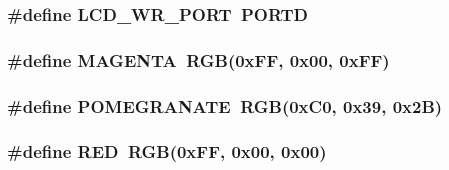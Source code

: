 \subsubsection[{L\+C\+D\+\_\+\+W\+R\+\_\+\+P\+O\+R\+T}]{\setlength{\rightskip}{0pt plus 5cm}\#define L\+C\+D\+\_\+\+W\+R\+\_\+\+P\+O\+R\+T~P\+O\+R\+T\+D}\label{group___s_s_d1289_ga815c38dc74dd91415221223106b0c75b}
\hypertarget{group___s_s_d1289_ga6f699060902f800f12aaae150f3a708e}{}
\subsubsection[{M\+A\+G\+E\+N\+T\+A}]{\setlength{\rightskip}{0pt plus 5cm}\#define M\+A\+G\+E\+N\+T\+A~{\bf R\+G\+B}(0x\+F\+F, 0x00, 0x\+F\+F)}\label{group___s_s_d1289_ga6f699060902f800f12aaae150f3a708e}
\hypertarget{group___s_s_d1289_ga9351998a06712daf19dda267d367074f}{}
\subsubsection[{P\+O\+M\+E\+G\+R\+A\+N\+A\+T\+E}]{\setlength{\rightskip}{0pt plus 5cm}\#define P\+O\+M\+E\+G\+R\+A\+N\+A\+T\+E~{\bf R\+G\+B}(0x\+C0, 0x39, 0x2\+B)}\label{group___s_s_d1289_ga9351998a06712daf19dda267d367074f}
\hypertarget{group___s_s_d1289_ga8d23feea868a983c8c2b661e1e16972f}{}
\subsubsection[{R\+E\+D}]{\setlength{\rightskip}{0pt plus 5cm}\#define R\+E\+D~{\bf R\+G\+B}(0x\+F\+F, 0x00, 0x00)}\label{group___s_s_d1289_ga8d23feea868a983c8c2b661e1e16972f}
\hypertarget{group___s_s_d1289_gaf1b70705887a3d5f250f1a1b31a98a22}{}
